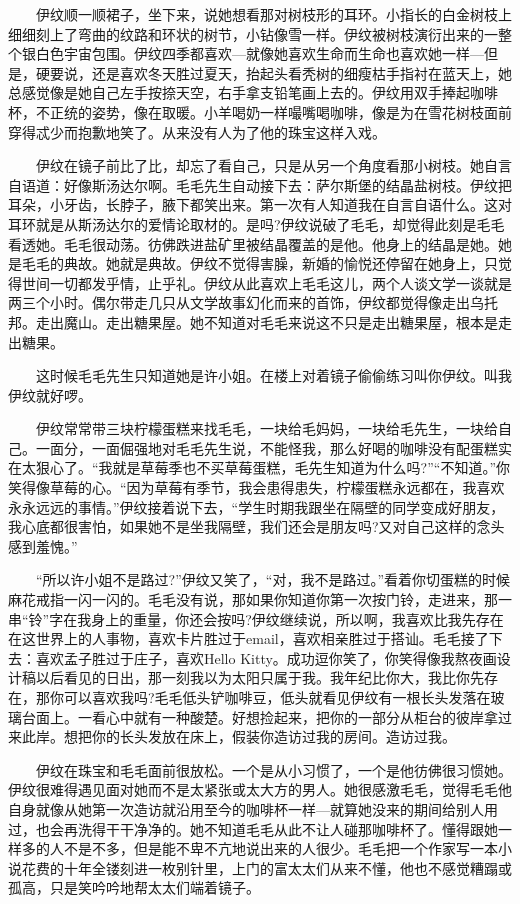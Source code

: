 \documentclass[12pt,UTF8]{ctexbook}
\begin{document}
　　伊纹顺一顺裙子，坐下来，说她想看那对树枝形的耳环。小指长的白金树枝上细细刻上了弯曲的纹路和环状的树节，小钻像雪一样。伊纹被树枝演衍出来的一整个银白色宇宙包围。伊纹四季都喜欢---就像她喜欢生命而生命也喜欢她一样---但是，硬要说，还是喜欢冬天胜过夏天，抬起头看秃树的细瘦枯手指衬在蓝天上，她总感觉像是她自己左手按捺天空，右手拿支铅笔画上去的。伊纹用双手捧起咖啡杯，不正统的姿势，像在取暖。小羊喝奶一样嘬嘴喝咖啡，像是为在雪花树枝面前穿得忒少而抱歉地笑了。从来没有人为了他的珠宝这样入戏。

　　伊纹在镜子前比了比，却忘了看自己，只是从另一个角度看那小树枝。她自言自语道：好像斯汤达尔啊。毛毛先生自动接下去：萨尔斯堡的结晶盐树枝。伊纹把耳朵，小牙齿，长脖子，腋下都笑出来。第一次有人知道我在自言自语什么。这对耳环就是从斯汤达尔的爱情论取材的。是吗?伊纹说破了毛毛，却觉得此刻是毛毛看透她。毛毛很动荡。彷佛跌进盐矿里被结晶覆盖的是他。他身上的结晶是她。她是毛毛的典故。她就是典故。伊纹不觉得害臊，新婚的愉悦还停留在她身上，只觉得世间一切都发乎情，止乎礼。伊纹从此喜欢上毛毛这儿，两个人谈文学一谈就是两三个小时。偶尔带走几只从文学故事幻化而来的首饰，伊纹都觉得像走出乌托邦。走出魔山。走出糖果屋。她不知道对毛毛来说这不只是走出糖果屋，根本是走出糖果。

　　这时候毛毛先生只知道她是许小姐。在楼上对着镜子偷偷练习叫你伊纹。叫我伊纹就好啰。

　　伊纹常常带三块柠檬蛋糕来找毛毛，一块给毛妈妈，一块给毛先生，一块给自己。一面分，一面倔强地对毛毛先生说，不能怪我，那么好喝的咖啡没有配蛋糕实在太狠心了。\enquote{我就是草莓季也不买草莓蛋糕，毛先生知道为什么吗?}\enquote{不知道。}你笑得像草莓的心。\enquote{因为草莓有季节，我会患得患失，柠檬蛋糕永远都在，我喜欢永永远远的事情。}伊纹接着说下去，\enquote{学生时期我跟坐在隔壁的同学变成好朋友，我心底都很害怕，如果她不是坐我隔壁，我们还会是朋友吗?又对自己这样的念头感到羞愧。}

　　\enquote{所以许小姐不是路过?}伊纹又笑了，\enquote{对，我不是路过。}看着你切蛋糕的时候麻花戒指一闪一闪的。毛毛没有说，那如果你知道你第一次按门铃，走进来，那一串\enquote{铃}字在我身上的重量，你还会按吗?伊纹继续说，所以啊，我喜欢比我先存在在这世界上的人事物，喜欢卡片胜过于email，喜欢相亲胜过于搭讪。毛毛接了下去：喜欢孟子胜过于庄子，喜欢Hello Kitty。成功逗你笑了，你笑得像我熬夜画设计稿以后看见的日出，那一刻我以为太阳只属于我。我年纪比你大，我比你先存在，那你可以喜欢我吗?毛毛低头铲咖啡豆，低头就看见伊纹有一根长头发落在玻璃台面上。一看心中就有一种酸楚。好想捡起来，把你的一部分从柜台的彼岸拿过来此岸。想把你的长头发放在床上，假装你造访过我的房间。造访过我。

　　伊纹在珠宝和毛毛面前很放松。一个是从小习惯了，一个是他彷佛很习惯她。伊纹很难得遇见面对她而不是太紧张或太大方的男人。她很感激毛毛，觉得毛毛他自身就像从她第一次造访就沿用至今的咖啡杯一样---就算她没来的期间给别人用过，也会再洗得干干净净的。她不知道毛毛从此不让人碰那咖啡杯了。懂得跟她一样多的人不是不多，但是能不卑不亢地说出来的人很少。毛毛把一个作家写一本小说花费的十年全镂刻进一枚别针里，上门的富太太们从来不懂，他也不感觉糟蹋或孤高，只是笑吟吟地帮太太们端着镜子。
\end{document}
